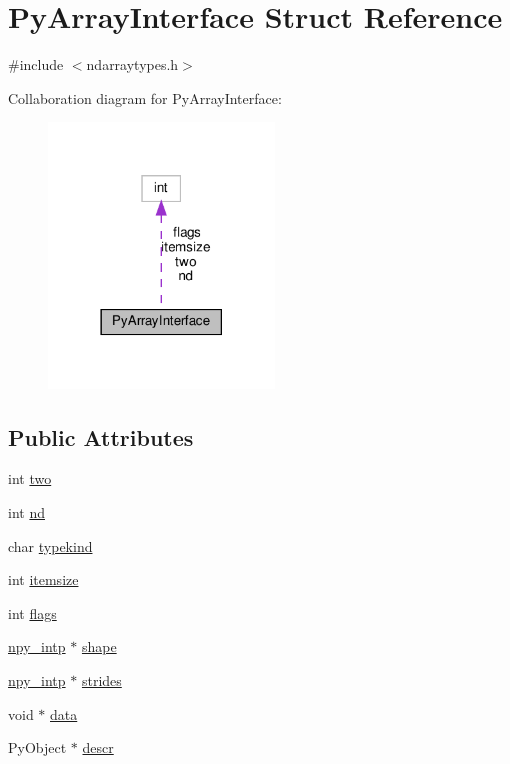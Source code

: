 \hypertarget{structPyArrayInterface}{}\section{Py\+Array\+Interface Struct Reference}
\label{structPyArrayInterface}


{\ttfamily \#include $<$ndarraytypes.\+h$>$}



Collaboration diagram for Py\+Array\+Interface\+:
\nopagebreak
\begin{figure}[H]
\begin{center}
\leavevmode
\includegraphics[width=170pt]{structPyArrayInterface__coll__graph}
\end{center}
\end{figure}
\subsection*{Public Attributes}
\begin{DoxyCompactItemize}
\item 
int \hyperlink{structPyArrayInterface_ab6d24fbafdbe601ef3c77720ffecb470}{two}
\item 
int \hyperlink{structPyArrayInterface_a7d5208cc0c4f5bcaaeff6e1bf02e35e3}{nd}
\item 
char \hyperlink{structPyArrayInterface_aae32b9e36b1b8fead0c2f69f2c5b899f}{typekind}
\item 
int \hyperlink{structPyArrayInterface_a175d53ca477bddfa28d6d0651bdb1a67}{itemsize}
\item 
int \hyperlink{structPyArrayInterface_ae4f40681a287c2abd1b36e9a660a1ad3}{flags}
\item 
\hyperlink{npy__common_8h_a2d6effc4d5ecb85675ebfcfaa102b483}{npy\+\_\+intp} $\ast$ \hyperlink{structPyArrayInterface_a4b6a02bad810f02841a2cdf3dee8f40c}{shape}
\item 
\hyperlink{npy__common_8h_a2d6effc4d5ecb85675ebfcfaa102b483}{npy\+\_\+intp} $\ast$ \hyperlink{structPyArrayInterface_ac881f1d31292469ae51a3fbf96fa485d}{strides}
\item 
void $\ast$ \hyperlink{structPyArrayInterface_a95a1efdd290ee7c788220b3802ccd717}{data}
\item 
Py\+Object $\ast$ \hyperlink{structPyArrayInterface_a7d517913182eeea2ee7cdb4803185cd6}{descr}
\end{DoxyCompactItemize}


